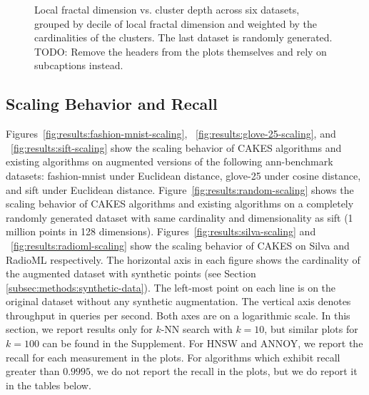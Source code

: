 \begin{figure}
\begin{subfigure}[b]{0.47\textwidth}
    \label{fig:results:random-lfd}
    \end{subfigure}
    \vspace{1em}
    \caption{Local fractal dimension vs. cluster depth across six datasets, grouped by decile of local fractal dimension and weighted by the cardinalities of the clusters.
    The last dataset is randomly generated.
    {\color{red} TODO: Remove the headers from the plots themselves and rely on subcaptions instead.}}
    \label{fig:results:lfd-plots}
\end{figure}



\subsection{Scaling Behavior and Recall}
\label{subsec:scaling-behavior-results}

Figures~\ref{fig:results:fashion-mnist-scaling}, ~\ref{fig:results:glove-25-scaling}, and ~\ref{fig:results:sift-scaling} show the scaling behavior of CAKES algorithms and existing algorithms on augmented versions of the following ann-benchmark datasets: fashion-mnist under Euclidean distance, glove-25 under cosine distance, and sift under Euclidean distance.
Figure~\ref{fig:results:random-scaling} shows the scaling behavior of CAKES algorithms and existing algorithms on a completely randomly generated dataset with same cardinality and dimensionality as sift (1 million points in 128 dimensions).
Figures~\ref{fig:results:silva-scaling} and ~\ref{fig:results:radioml-scaling} show the scaling behavior of CAKES on Silva and RadioML respectively.
The horizontal axis in each figure shows the cardinality of the augmented dataset with synthetic points (see Section \ref{subsec:methods:synthetic-data}).
The left-most point on each line is on the original dataset without any synthetic augmentation.
The vertical axis denotes throughput in queries per second.
Both axes are on a logarithmic scale.
In this section, we report results only for $k$-NN search with $k = 10$, but similar plots for $k=100$ can be found in the Supplement.
For HNSW and ANNOY, we report the recall for each measurement in the plots. For algorithms which exhibit recall greater than $0.9995$, we do not report the recall in the plots, but we do report it in the tables below.


